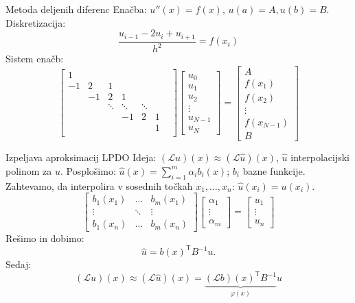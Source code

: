\documentclass[t]{beamer} %
\newcommand{\T}{\mathsf{T}}
\renewcommand{\L}{\mathcal{L}}
\begin{document}
\begin{frame}{Metoda deljenih diferenc}
  Enačba: $u''(x) = f(x)$, $u(a) = A, u(b) = B$. \\[2ex]
  Diskretizacija: \[
  \frac{u_{i-1} - 2u_{i} + u_{i+1}}{h^2} = f(x_i)\]
  Sistem enačb:
  \[
   \begin{bmatrix}
  1 &  \\
  -1 & 2 & 1 \\
  & -1 & 2 & 1 \\
  & & \!\ddots & \!\ddots & \! \ddots \\
  &&& -1 & 2 & 1 \\
  &&&&&  1 &  \\
    \end{bmatrix}
    \begin{bmatrix}
    u_0 \\ u_1 \\ u_2 \\ \vdots \\ u_{N-1} \\ u_N
    \end{bmatrix}
    =
    \begin{bmatrix}
    A \\
    f(x_1) \\
    f(x_2) \\
    \vdots \\
    f(x_{N-1}) \\
    B
    \end{bmatrix}
  \]
\end{frame}

\begin{frame}{Izpeljava aproksimacij LPDO}
  Ideja: $(\L u)(x) \approx (\L \hat{u})(x)$, $\hat{u}$ interpolacijski polinom za $u$.
  Posplošimo: $\hat{u}(x) = \sum_{i=1}^m \alpha_i b_i(x)$; $b_i$ bazne funkcije.
  Zahtevamo, da interpolira v sosednih točkah $x_1, \dots, x_n$: $\hat{u}(x_i) = u(x_i)$.
  \[
  \begin{bmatrix}
  b_1(x_1) & \ldots & b_m(x_1) \\
  \vdots & \ddots & \vdots \\
  b_1(x_n) & \ldots & b_m(x_n)
  \end{bmatrix}
  \begin{bmatrix}
  \alpha_1 \\ \vdots \\ \alpha_m
  \end{bmatrix}
  =
  \begin{bmatrix}
  u_1 \\ \vdots \\ u_n
  \end{bmatrix}
  \]
  Rešimo in dobimo:
  \[
  \hat{u} = b(x)^\T B^{-1} u.
  \]
  Sedaj:
   \[ (\L u)(x) \approx (\L \hat{u})(x) = \underbrace{(\L b)(x)^\T B^{-1}}_{\varphi(x)} u \]
\end{frame}
\end{document}
